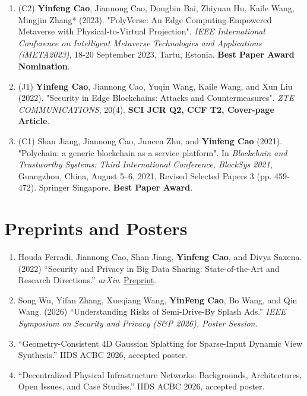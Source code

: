 \documentclass{resume}
\begin{document}
\begin{content}
\begin{enumerate}
        \item (C2) \textbf{Yinfeng Cao}, Jiannong Cao, Dongbin Bai, Zhiyuan Hu, Kaile Wang, Mingjin Zhang* (2023). "PolyVerse: An Edge Computing-Empowered Metaverse with Physical-to-Virtual Projection". \textit{IEEE International Conference on Intelligent Metaverse Technologies and Applications (iMETA2023)}, 18-20 September 2023, Tartu, Estonia. \textbf{Best Paper Award Nomination}.

        \item (J1) \textbf{Yinfeng Cao}, Jiannong Cao, Yuqin Wang, Kaile Wang, and Xun Liu (2022). "Security in Edge Blockchains: Attacks and Countermeasures". \textit{ZTE COMMUNICATIONS}, 20(4). \textbf{SCI JCR Q2, CCF T2, Cover-page Article}.

        \item (C1) Shan Jiang, Jiannong Cao, Juncen Zhu, and \textbf{Yinfeng Cao} (2021). "Polychain: a generic blockchain as a service platform". In \textit{Blockchain and Trustworthy Systems: Third International Conference, BlockSys 2021}, Guangzhou, China, August 5--6, 2021, Revised Selected Papers 3 (pp. 459-472). Springer Singapore. \textbf{Best Paper Award}.
    \end{enumerate}
\sectionlineskip
\end{content}

\section{Preprints and Posters}
\begin{content}
    \begin{enumerate}
        \item Houda Ferradi, Jiannong Cao, Shan Jiang, \textbf{Yinfeng Cao}, and Divya Saxena. (2022) ``Security and Privacy in Big Data Sharing: State-of-the-Art and Research Directions.'' \textit{arXiv}. \href{https://arxiv.org/abs/2210.09230}{Preprint}.
        \item Song Wu, Yifan Zhang, Xueqiang Wang, \textbf{YinFeng Cao}, Bo Wang, and Qin Wang. (2026) ``Understanding Risks of Semi-Drive-By Splash Ads.'' \textit{IEEE Symposium on Security and Privacy (S\&P 2026), Poster Session}.
        \item ``Geometry-Consistent 4D Gaussian Splatting for Sparse-Input Dynamic View Synthesis.'' IIDS ACBC 2026, accepted poster.
        \item ``Decentralized Physical Infrastructure Networks: Backgrounds, Architectures, Open Issues, and Case Studies.'' IIDS ACBC 2026, accepted poster.
    \end{enumerate}
\sectionlineskip
\end{content}
\end{document}
